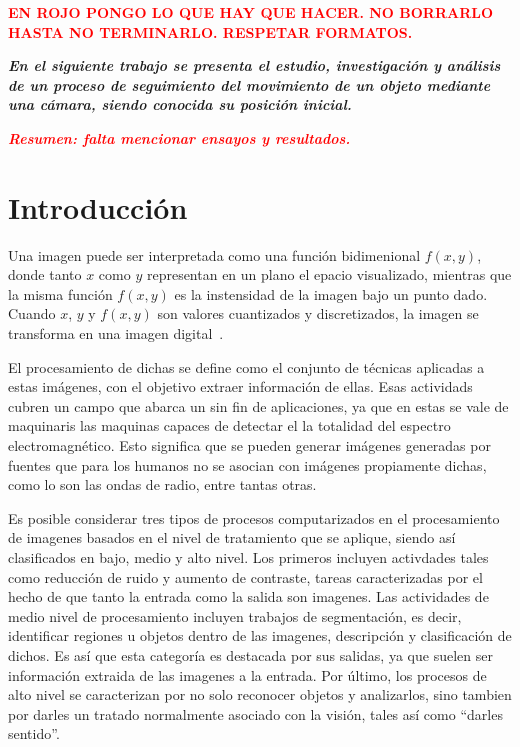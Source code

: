 








\begin{center}
	\Large{\textcolor{red}{\textbf{EN ROJO PONGO LO QUE HAY QUE HACER. NO BORRARLO HASTA NO TERMINARLO. RESPETAR FORMATOS.}}}
\end{center}

\textbf{\textit{En el siguiente trabajo se presenta el estudio, investigación y análisis de un proceso de seguimiento del movimiento de un objeto mediante una cámara, siendo conocida su posición inicial.}}

\textcolor{red}{\textbf{\textit{Resumen: falta mencionar ensayos y resultados.}}}

\section{Introducción}
	Una imagen puede ser interpretada como una función bidimenional $f\left( x, y\right)$, donde tanto $x$ como $y$ representan en un plano el epacio visualizado, mientras que la misma función $f\left( x, y\right)$ es la instensidad de la imagen bajo un punto dado. Cuando $x$, $y$ y $f\left( x, y\right)$ son valores cuantizados y discretizados, la imagen se transforma en una imagen digital~\cite{ref:intro1}.
	 	
	El procesamiento de dichas se define como el conjunto de técnicas aplicadas a estas imágenes, con el objetivo extraer información de ellas. Esas actividads cubren un campo que abarca un sin fin de aplicaciones, ya que en estas se vale de maquinaris las maquinas capaces de detectar el la totalidad del espectro electromagnético. Esto significa que se pueden generar imágenes generadas por fuentes que para los humanos no se asocian con imágenes propiamente dichas, como lo son las ondas de radio, entre tantas otras.
	
	Es posible considerar tres tipos de procesos computarizados en el procesamiento de imagenes basados en el nivel de tratamiento que se aplique, siendo así clasificados en bajo, medio y alto nivel. Los primeros incluyen activdades tales como reducción de ruido y aumento de contraste, tareas caracterizadas por el hecho de que tanto la entrada como la salida son imagenes. Las actividades de medio nivel de procesamiento incluyen trabajos de segmentación, es decir, identificar regiones u objetos dentro de las imagenes, descripción y clasificación de dichos. Es así que esta categoría es destacada por sus salidas, ya que suelen ser información extraida de las imagenes a la entrada. Por último, los procesos de alto nivel se caracterizan por no solo reconocer objetos y analizarlos, sino tambien por darles un tratado normalmente asociado con la visión, tales así como ``darles sentido''.
	
